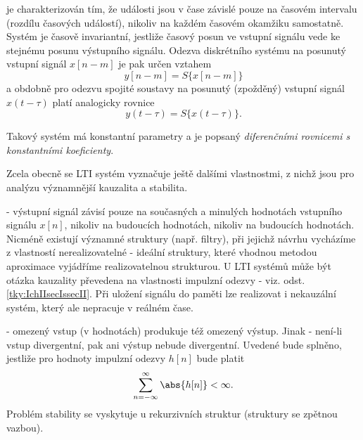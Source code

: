 \begin{description}[leftmargin=3em,labelindent=1em, style=nextline]
      \item[Systém časově invariantní] je charakterizován tím, že události jsou v čase závislé pouze
            na časovém intervalu (rozdílu časových událostí), nikoliv na každém časovém okamžiku
            samostatně. Systém je časově invariantní, jestliže časový posun ve vstupní signálu vede
            ke stejnému posunu výstupního signálu. Odezva diskrétního systému na posunutý vstupní
            signál \(x[n-m]\) je pak určen vztahem
            \begin{equation}\label{tky:eq009}
              y[n-m]= S\{x[n-m]\}
            \end{equation}
            a obdobně pro odezvu spojité soustavy na posunutý (zpožděný) vstupní signál
            \(x(t-\tau)\) platí analogicky rovnice
            \begin{equation}\label{tky:eq010}
              y(t-\tau)= S\{x(t-\tau)\}.
            \end{equation}
    \end{description}

    Takový systém má konstantní parametry a je popsaný \emph{diferenčními rovnicemi s konstantními
    koeficienty}. 
    
    Zcela obecně se \textsc{LTI} systém vyznačuje ještě dalšími vlastnostmi, z nichž jsou pro
    analýzu významnější kauzalita a stabilita. 
    \begin{description}[leftmargin=3em,labelindent=1em, style=nextline]
      \item[Kauzální, příčinný systém] - výstupní signál závisí pouze na současných a
            minulých hodnotách vstupního signálu \(x[n]\), nikoliv na budoucích hodnotách, nikoliv
            na budoucích hodnotách. Nicméně existují významné struktury (např. filtry), při jejichž
            návrhu vycházíme z vlastností nerealizovatelné - ideální struktury, které vhodnou
            metodou aproximace vyjádříme realizovatelnou strukturou. U \textsc{LTI} systémů může být
            otázka kauzality převedena na vlastnosti impulzní odezvy - viz. odst.
            \ref{tky:IchIIsecIssecII}. Při uložení signálu do paměti lze realizovat i nekauzální
            systém, který ale nepracuje v reálném čase. 
      \item[Stabilní systém] - omezený vstup (v hodnotách) produkuje též omezený výstup.
            Jinak - není-li vstup divergentní, pak ani výstup nebude divergentní. Uvedené bude
            splněno, jestliže pro hodnoty impulzní odezvy \(h[n]\) bude platit
            \begin{equation*}
              \sum_{n=-\infty}^\infty\abs{h[n]} <\infty.
            \end{equation*}
            Problém stability se vyskytuje u rekurzivních struktur (struktury se zpětnou vazbou). 
    \end{description}      

